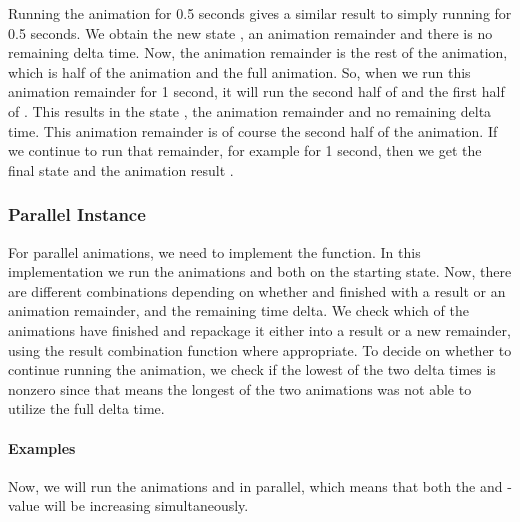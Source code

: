Running the  animation for 0.5 seconds gives a similar result to simply running  for 0.5 seconds. We obtain the new state , an animation remainder  and there is no remaining delta time. Now, the animation remainder is the rest of the  animation, which is half of the  animation and the full  animation. So, when we run this animation remainder for 1 second, it will run the second half of  and the first half of .
This results in the state , the animation remainder  and no remaining delta time. This animation remainder is of course the second half of the  animation. If we continue to run that remainder, for example for 1 second, then we get the final state  and the animation result \hs{()}.


\subsubsection{Parallel Instance}

For parallel animations, we need to implement the  function. In this implementation we run the animations  and  both on the starting state. Now, there are different combinations depending on whether  and  finished with a result or an animation remainder, and the remaining time delta. We check which of the animations have finished and repackage it either into a result or a new remainder, using the result combination function where appropriate. To decide on whether to continue running the animation, we check if the lowest of the two delta times is nonzero since that means the longest of the two animations was not able to utilize the full delta time.

\paragraph{Examples}

Now, we will run the animations  and  in parallel, which means that both the  and -value will be increasing simultaneously.

